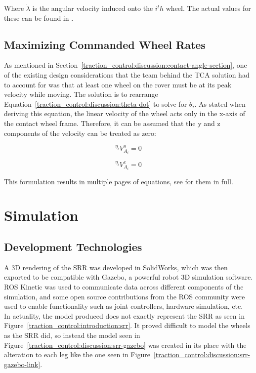 Where $\dot{\lambda}$ is the angular velocity induced onto the $i^th$ wheel. The actual values for these can be found in \cite{tractl}.

\subsection{Maximizing Commanded Wheel Rates}\label{traction_control:discussion:max-wheel-rates}
As mentioned in Section~\ref{traction_control:discussion:contact-angle-section}, one of the existing design considerations that the team behind the \ac{TCA} solution had to account for was that at least one wheel on the rover must be at its peak velocity while moving. The solution is to rearrange Equation~\ref{traction_control:discussion:theta-dot} to solve for $\dot{\theta}_{i}$. As stated when deriving this equation, the linear velocity of the wheel acts only in the x-axis of the contact wheel frame. Therefore, it can be assumed that the y and z components of the velocity can be treated as zero:

\begin{equation}\label{traction_control:discussion:lin_vel_y}
	{}^{\eta_{i}}V^{y}_{A_{i}} = 0
\end{equation}

\begin{equation}\label{traction_control:discussion:lin_vel_z}
	{}^{\eta_{i}}V^{z}_{A_{i}} = 0
\end{equation}

This formulation results in multiple pages of equations, see \cite{tractl} for them in full.

\acresetall
\section{Simulation}
\subsection{Development Technologies}\label{traction_control:discussion:dev-tech-section}
A 3D rendering of the \ac{SRR} was developed in SolidWorks, which was then exported to be compatible with Gazebo, a powerful robot 3D simulation software. ROS Kinetic was used to communicate data across different components of the simulation, and some open source contributions from the ROS community were used to enable functionality such as joint controllers, hardware simulation, etc. \\

In actuality, the model produced does not exactly represent the \ac{SRR} as seen in Figure~\ref{traction_control:introduction:srr}. It proved difficult to model the wheels as the \ac{SRR} did, so instead the model seen in Figure~\ref{traction_control:discussion:srr-gazebo} was created in its place with the alteration to each leg like the one seen in Figure~\ref{traction_control:discussion:srr-gazebo-link}.


